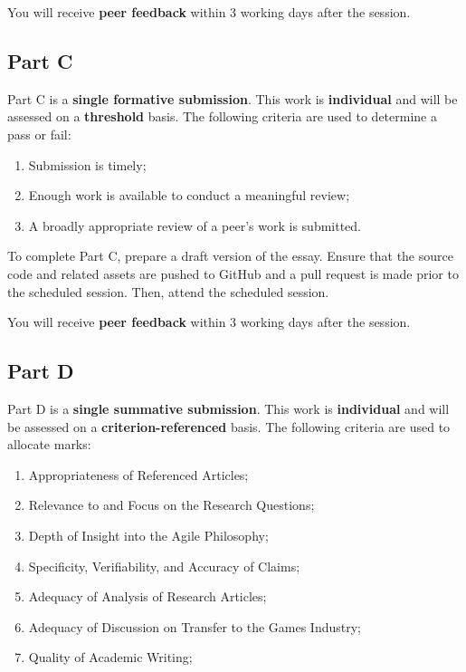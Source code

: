 \documentclass{../fal_assignment}
\begin{document}
You will receive \textbf{peer feedback} within 3 working days after the session.

\subsection*{Part C}

Part C is a \textbf{single formative submission}. This work is \textbf{individual} and will be assessed on a \textbf{threshold} basis. The following criteria are used to determine a pass or fail:

\begin{enumerate}[label=(\alph*)]
	\item Submission is timely;
	\item Enough work is available to conduct a meaningful review;
	\item A broadly appropriate review of a peer's work is submitted.
\end{enumerate}

To complete Part C, prepare a draft version of the essay. Ensure that the source code and related assets are pushed to GitHub and a pull request is made prior to the scheduled session. Then, attend the scheduled session.

You will receive \textbf{peer feedback} within 3 working days after the session.

\subsection*{Part D}

Part D is a \textbf{single summative submission}. This work is \textbf{individual} and will be assessed on a \textbf{criterion-referenced} basis. The following criteria are used to allocate marks:

\begin{enumerate}[label=(\alph*)]
	\item Appropriateness of Referenced Articles;
	\item Relevance to and Focus on the Research Questions;
	\item Depth of Insight into the Agile Philosophy;
	\item Specificity, Verifiability, and Accuracy of Claims;
	\item Adequacy of Analysis of Research Articles;	
	\item Adequacy of Discussion on Transfer to the Games Industry;
	\item Quality of Academic Writing;
\end{enumerate}
\end{document}
